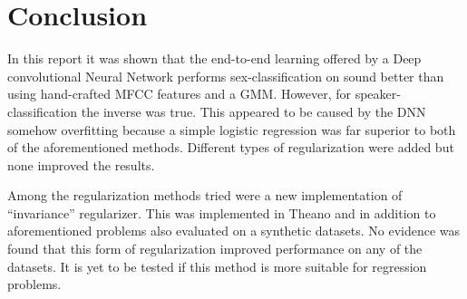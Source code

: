 \section{Conclusion}

In this report it was shown that the end-to-end learning offered by a Deep convolutional Neural Network performs sex-classification on sound better than using hand-crafted MFCC features and a GMM. However, for speaker-classification the inverse was true. This appeared to be caused by the DNN somehow overfitting because a simple logistic regression was far superior to both of the aforementioned methods. Different types of regularization were added but none improved the results. 

Among the regularization methods tried were a new implementation of ``invariance'' regularizer. This was implemented in Theano and in addition to aforementioned problems also evaluated on a synthetic datasets. No evidence was found that this form of regularization improved performance on any of the datasets. It is yet to be tested if this method is more suitable for regression problems.